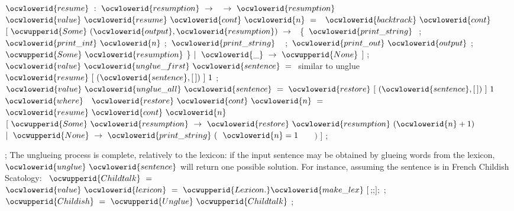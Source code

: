 \documentclass[12pt]{article}
\begin{document}
\ocwendcode{}\ocwindent{0.00em}
\ocwbegindcode{}$\ocwlowerid{resume}~:~\ocwlowerid{resumption}~\rightarrow{}~$~$\rightarrow{}~\ocwlowerid{resumption}$\ocwenddcode{} 
\ocweol
\label{../ML/unglue.ml:3960}%
\medskip
\ocwbegincode{}\ocwindent{0.00em}
$\ocwlowerid{value}~\ocwlowerid{resume}~\ocwlowerid{cont}~\ocwlowerid{n}~=~$~$\ocwlowerid{backtrack}~\ocwlowerid{cont}~$\ocweol
\ocwindent{1.00em}
$[~\ocwupperid{Some}~(\ocwlowerid{output},\ocwlowerid{resumption})~\rightarrow{}~$\ocweol
\ocwindent{2.50em}
\{~$\ocwlowerid{print\_string}~$\ocweol
\ocwindent{2.50em}
;~$\ocwlowerid{print\_int}~\ocwlowerid{n}$\ocweol
\ocwindent{2.50em}
;~$\ocwlowerid{print\_string}~$~\ocweol
\ocwindent{2.50em}
;~$\ocwlowerid{print\_out}~\ocwlowerid{output}$\ocweol
\ocwindent{2.50em}
;~$\ocwupperid{Some}~\ocwlowerid{resumption}$\ocweol
\ocwindent{2.50em}
\}\ocweol
\ocwindent{1.00em}
$\mid{}~\ocwlowerid{\_}~\rightarrow{}~\ocwupperid{None}$\ocweol
\ocwindent{0.00em}
$]$\ocweol
\ocwindent{0.00em}
;\ocweol
\ocwindent{0.00em}
$\ocwlowerid{value}~\ocwlowerid{unglue\_first}~\ocwlowerid{sentence}~=~$\ocwbc{} similar to unglue \ocwec{}~\ocweol
\ocwindent{1.00em}
$\ocwlowerid{resume}~[~(\ocwlowerid{sentence},[\,])~]~1$\ocweol
\ocwindent{0.00em}
;\ocweol
\ocwindent{0.00em}
$\ocwlowerid{value}~\ocwlowerid{unglue\_all}~\ocwlowerid{sentence}~=~\ocwlowerid{restore}~[~(\ocwlowerid{sentence},[\,])~]~1$\ocweol
\ocwindent{1.00em}
$\ocwlowerid{where}~$~$\ocwlowerid{restore}~\ocwlowerid{cont}~\ocwlowerid{n}~=~$~$\ocwlowerid{resume}~\ocwlowerid{cont}~\ocwlowerid{n}~$\ocweol
\ocwindent{1.00em}
$[~\ocwupperid{Some}~\ocwlowerid{resumption}~\rightarrow{}~\ocwlowerid{restore}~\ocwlowerid{resumption}~(\ocwlowerid{n}+1)$\ocweol
\ocwindent{1.00em}
$\mid{}~\ocwupperid{None}~\rightarrow{}~\ocwlowerid{print\_string}~($~$\ocwlowerid{n}=1~$~~~$)$\ocweol
\ocwindent{1.00em}
$]$\ocweol
\ocwindent{0.00em}
;\medskip

\label{../ML/unglue.ml:4519}%
\ocwindent{0.00em}
;\ocweol
\ocwendcode{}
\label{../ML/unglue_test.ml:0}%
The unglueing process is complete, relatively to the lexicon: if the input 
sentence may be obtained by glueing words from the lexicon, \ocwbegindcode{}$\ocwlowerid{unglue}~\ocwlowerid{sentence}$\ocwenddcode{}
will return one possible solution. For instance, assuming the sentence is 
in French Childish Scatology: 
\ocweol
\label{../ML/unglue_test.ml:911}%
\medskip
\ocwbegincode{}\ocwindent{0.00em}
~$\ocwupperid{Childtalk}~=~$\ocweol
\ocwindent{0.00em}
$\ocwlowerid{value}~\ocwlowerid{lexicon}~=~\ocwupperid{Lexicon.}\ocwlowerid{make\_lex}~[$;;$];$\ocweol
\ocwindent{0.00em}
\ocweol
\ocwindent{0.00em}
;\ocweol
\ocwindent{0.00em}
~$\ocwupperid{Childish}~=~\ocwupperid{Unglue}~\ocwupperid{Childtalk}$\ocweol
\ocwindent{0.00em}
;\medskip
\end{document}
